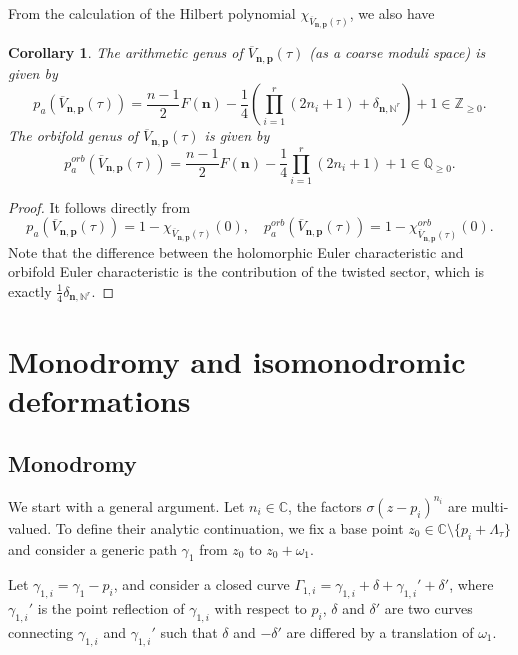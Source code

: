 \documentclass[11pt]{amsart}
\newtheorem{corollary}[theorem]{Corollary}
\theoremstyle{remark}
\numberwithin{equation}{section}
\begin{document}
From the calculation of the Hilbert polynomial $\chi_{\overline{V}_{\mathbf{n},\mathbf{p}}(\tau)}$, we also have

\begin{corollary} \label{Vn-genus}
The arithmetic genus of $\overline{V}_{\mathbf{n},\mathbf{p}}(\tau)$ (as a coarse moduli space) is given by 
\[
p_a(\overline{V}_{\mathbf{n},\mathbf{p}}(\tau))=\frac{n-1}{2}F(\mathbf{n})-\frac{1}{4}\left( \prod_{i=1}^r(2n_i+1)+\delta_{\mathbf{n},\mathbb{N}^r} \right)+1 \in \mathbb{Z}_{\geq 0}.
\]
The orbifold genus of $\overline{V}_{\mathbf{n},\mathbf{p}}(\tau)$ is given by 
\[
p_{a}^{orb}(\overline{V}_{\mathbf{n},\mathbf{p}}(\tau))=\frac{n-1}{2}F(\mathbf{n})-\frac{1}{4}\prod_{i=1}^r(2n_i+1)+1 \in \mathbb{Q}_{\geq 0}. 
\]
\end{corollary}
\begin{proof}
It follows directly from 
\[
    p_a(\overline{V}_{\mathbf{n},\mathbf{p}}(\tau))  = 1 - \chi_{\overline{V}_{\mathbf{n},\mathbf{p}}(\tau)}(0), \quad p_a^{orb}(\overline{V}_{\mathbf{n},\mathbf{p}}(\tau)) = 1- \chi^{orb}_{\overline{V}_{\mathbf{n},\mathbf{p}}(\tau)}(0).
\]
Note that the difference between the holomorphic Euler characteristic and orbifold Euler characteristic is the contribution of the twisted sector, which is exactly $\frac{1}{4}\delta_{\mathbf{n},\mathbb{N}^r}$. 
\end{proof}


\section{Monodromy and isomonodromic deformations}

\subsection{Monodromy}
We start with a general argument. Let $n_i \in \mathbb{C}$, the factors $\sigma(z-p_i)^{n_i}$ are multi-valued. To define their analytic continuation, we fix a base point $z_0 \in \mathbb{C} \setminus \{p_i + \Lambda_\tau\}$ and consider a generic path $\gamma_1$ from $z_0$ to $z_0+\omega_1$. 

Let $\gamma_{1,i} = \gamma_1 - p_i$, and consider a closed curve $\Gamma_{1,i} = \gamma_{1,i} + \delta + \gamma_{1,i}' + \delta'$, where $\gamma_{1,i}'$ is the point reflection of $\gamma_{1,i}$ with respect to $p_i$, $\delta$ and $\delta'$ are two curves connecting $\gamma_{1,i}$ and $\gamma_{1,i}'$ such that $\delta$ and $-\delta'$ are differed by a translation of $\omega_1$.
\end{document}
